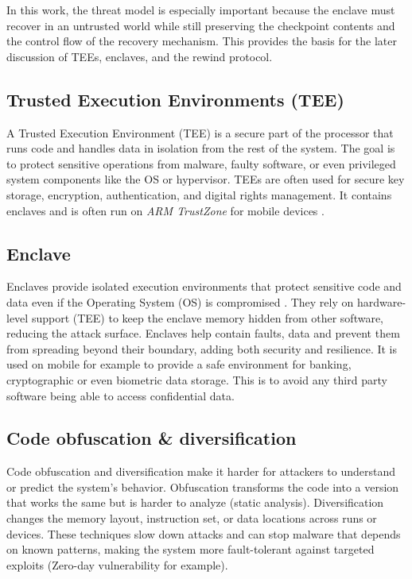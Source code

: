 \documentclass[11pt,a4paper]{report}
\begin{document}
In this work, the threat model is especially important because the enclave must recover in an untrusted world while still preserving the checkpoint contents and the control flow of the recovery mechanism.
This provides the basis for the later discussion of TEEs, enclaves, and the rewind protocol.

\subsection{Trusted Execution Environments (TEE)}
A Trusted Execution Environment (TEE) \cite{TEE} is a secure part of the processor that runs code and handles data in isolation from the rest of the system. 
The goal is to protect sensitive operations from malware, faulty software, or even privileged system components like the OS or hypervisor. 
TEEs are often used for secure key storage, encryption, authentication, and digital rights management. 
It contains enclaves and is often run on \textit{ARM TrustZone} for mobile devices \cite{ARM-TrustZone-CortexM}.

\subsection{Enclave}
Enclaves provide isolated execution environments that protect sensitive code and data even if the Operating System (OS) is compromised \cite{enclave}. 
They rely on hardware-level support (TEE) to keep the enclave memory hidden from other software, reducing the attack surface. Enclaves help contain faults, data and prevent them from spreading beyond their boundary, adding both security and resilience. It is used on mobile for example to provide a safe environment for banking, cryptographic or even biometric data storage. 
This is to avoid any third party software being able to access confidential data.

\subsection{Code obfuscation \& diversification}
Code obfuscation and diversification make it harder for attackers to understand or predict the system’s behavior. Obfuscation transforms the code into a version that works the same but is harder to analyze (static analysis). Diversification changes the memory layout, instruction set, or data locations across runs or devices. 
These techniques slow down attacks and can stop malware that depends on known patterns, making the system more fault-tolerant against targeted exploits (Zero-day vulnerability for example).
\end{document}
